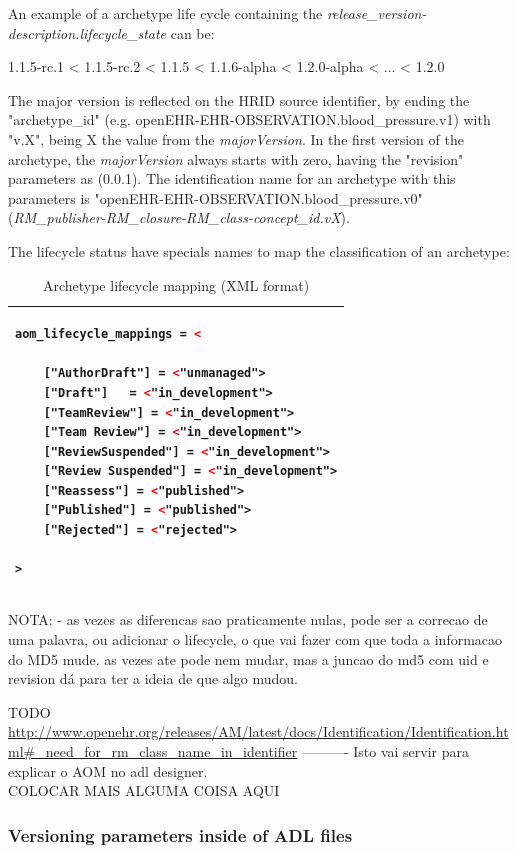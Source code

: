 \documentclass[mim_thesis.tex]{subfiles}
\begin{document}
An example of a archetype life cycle containing the \textit{release\_version-description.lifecycle\_state} can be: 
\begin{center}
{1.1.5-rc.1 < 1.1.5-rc.2 < 1.1.5 < 1.1.6-alpha < 1.2.0-alpha < ... < 1.2.0}
\end{center}

The major version is reflected on the HRID source identifier, by ending the "archetype\_id" (e.g. openEHR-EHR-OBSERVATION.blood\_pressure.v1) with "v.X", being X the value from the \textit{majorVersion}. In the first version of the archetype, the  \textit{majorVersion} always starts with zero, having the "revision" parameters as (0.0.1). The identification name for an archetype with this parameters is "openEHR-EHR-OBSERVATION.blood\_pressure.v0" (\textit{RM\_publisher-RM\_closure-RM\_class-concept\_id.vX}).

The lifecycle status have specials names to map the classification of an archetype:
\begin{table}[H]
\caption{Archetype lifecycle mapping (XML format)}
\label{tab:arch_lifecycle_xml}
\centering
\begin{tabular}{l}
\toprule[2pt]
\begin{lstlisting}[language=XML]
aom_lifecycle_mappings = <

	["AuthorDraft"] = <"unmanaged">
	["Draft"]	= <"in_development">
	["TeamReview"] = <"in_development">
	["Team Review"] = <"in_development">
	["ReviewSuspended"] = <"in_development">
	["Review Suspended"] = <"in_development">
	["Reassess"] = <"published">
	["Published"] = <"published">
	["Rejected"] = <"rejected">

>
\end{lstlisting}
\tabularnewline \bottomrule[2pt]
\end{tabular}
\end{table}


NOTA: - as vezes as diferencas sao praticamente nulas, pode ser a correcao de uma palavra, ou adicionar o lifecycle, o que vai fazer com que toda a informacao do MD5 mude. as vezes ate pode nem mudar, mas a juncao do md5 com uid e revision dá para ter a ideia de que algo mudou.

TODO \url{http://www.openehr.org/releases/AM/latest/docs/Identification/Identification.html#_need_for_rm_class_name_in_identifier}
---------- Isto vai servir para explicar o AOM no adl designer.\\
COLOCAR MAIS ALGUMA COISA AQUI

\subsubsection{Versioning parameters inside of ADL files}
\end{document}
